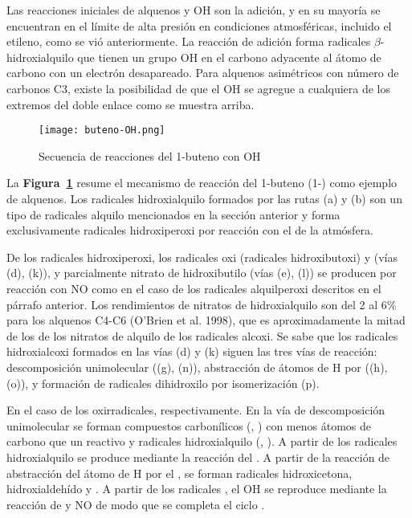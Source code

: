 {Las reacciones iniciales de alquenos y OH son la adición, y en su mayoría se encuentran en el límite de alta presión en condiciones atmosféricas, incluido el etileno, como se vió anteriormente. La reacción de adición forma radicales $\beta$-hidroxialquilo que tienen un grupo OH en el carbono adyacente al átomo de carbono con un electrón desapareado.
Para alquenos asimétricos con número de carbonos C3, existe la posibilidad de que el OH se agregue a cualquiera de los extremos del doble enlace como se muestra arriba.

\begin{figure}[htbp]
\begin{center}
\texttt{[image: buteno-OH.png]}
\caption{Secuencia de reacciones del 1-buteno con OH}
\label{butenOH}
\end{center}
\end{figure}

La \textbf{Figura~\ref{butenOH}} resume el mecanismo de reacción del 1-buteno (1-) como ejemplo de alquenos. Los radicales hidroxialquilo formados por las rutas (a) y (b) son un tipo de radicales alquilo mencionados en la sección anterior y forma exclusivamente radicales hidroxiperoxi por reacción con el  de la atmósfera.

De los radicales hidroxiperoxi, los radicales oxi (radicales hidroxibutoxi) y  (vías (d), (k)), y parcialmente nitrato de hidroxibutilo (vías (e), (l)) se producen por reacción con NO como en el caso de los radicales alquilperoxi descritos en el párrafo anterior. Los rendimientos de nitratos de hidroxialquilo son del 2 al 6\% para los alquenos C4-C6 (O’Brien et al. 1998), que es aproximadamente la mitad de los de los nitratos de alquilo de los radicales alcoxi. Se sabe que los radicales hidroxialcoxi formados en las vías (d) y (k) siguen las tres vías de reacción: descomposición unimolecular ((g), (n)), abstracción de átomos de H por  ((h), (o)), y formación de radicales dihidroxilo por isomerización (p).

En el caso de los oxirradicales, respectivamente. En la vía de descomposición unimolecular se forman compuestos carbonílicos (, ) con menos átomos de carbono que un reactivo y radicales hidroxialquilo (, ). A partir de los radicales hidroxialquilo se produce  mediante la reacción del . A partir de la reacción de abstracción del átomo de H por el , se forman radicales hidroxicetona, hidroxialdehído y . A partir de los radicales , el OH se reproduce mediante la reacción de  y NO de modo que se completa el ciclo .

}
